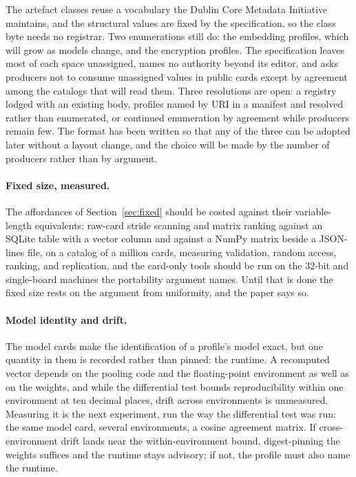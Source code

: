 \documentclass[sigconf]{acmart}
\begin{document}
The artefact classes reuse a vocabulary the Dublin Core Metadata
Initiative maintains, and the structural values are fixed by the
specification, so the class byte needs no registrar. Two enumerations still
do: the embedding profiles, which will grow as models change, and the
encryption profiles. The specification leaves most of each space unassigned,
names no authority beyond its editor, and asks producers not to consume
unassigned values in public cards except by agreement among the catalogs
that will read them. Three resolutions are open: a registry lodged with an
existing body, profiles named by URI in a manifest and resolved rather than
enumerated, or continued enumeration by agreement while producers remain
few. The format has been written so that any of the three can be adopted
later without a layout change, and the choice will be made by the number of
producers rather than by argument.

\paragraph{Fixed size, measured.} The affordances of
Section~\ref{sec:fixed} should be costed against their variable-length
equivalents: raw-card stride scanning and matrix ranking against an SQLite
table with a vector column and against a NumPy matrix beside a JSON-lines
file, on a catalog of a million cards, measuring validation, random access,
ranking, and replication, and the card-only tools should be run on the 32-bit
and single-board machines the portability argument names. Until that is done
the fixed size rests on the argument from uniformity, and the paper says so.

\paragraph{Model identity and drift.} The model cards make the identification
of a profile's model exact, but one quantity in them is recorded rather than
pinned: the runtime. A recomputed vector depends on the pooling code and the
floating-point environment as well as on the weights, and while the
differential test bounds reproducibility within one environment at ten
decimal places, drift across environments is unmeasured. Measuring it is the
next experiment, run the way the differential test was run: the same model
card, several environments, a cosine agreement matrix. If cross-environment
drift lands near the within-environment bound, digest-pinning the weights
suffices and the runtime stays advisory; if not, the profile must also name
the runtime.
\end{document}
